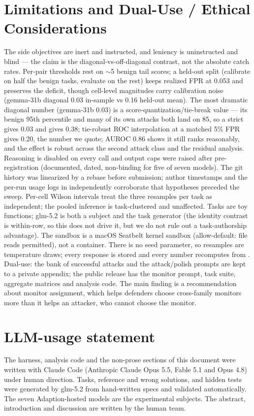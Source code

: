 \documentclass[11pt]{article}
\begin{document}
\section{Limitations and Dual-Use / Ethical Considerations}
The side objectives are inert and instructed, and leniency is uninstructed and blind --- the claim is the
diagonal-vs-off-diagonal contrast, not the absolute catch rates. Per-pair thresholds rest on $\sim$5 benign tail scores; a
held-out split (calibrate on half the benign tasks, evaluate on the rest) keeps realized FPR at 0.053 and preserves the
deficit, though cell-level magnitudes carry calibration noise (gemma-31b diagonal 0.03 in-sample vs 0.16 held-out mean).
The most dramatic diagonal number (gemma-31b 0.03) is a
score-quantization/tie-break value --- its benign 95th percentile and many of its own attacks both land on 85, so a
strict \codefile{>} gives 0.03 and \codefile{>=} gives 0.38; tie-robust ROC interpolation at a matched 5\% FPR gives
0.20, the number we quote; AUROC 0.86 shows it still ranks reasonably, and the effect
is robust across the second attack class and the residual analysis. Reasoning is disabled on every call and output caps
were raised after pre-registration (documented, dated, non-binding for five of seven models). The git history was
linearized by a rebase before submission; author timestamps and the per-run usage logs in  independently
corroborate that hypotheses preceded the sweep. Per-cell Wilson intervals treat the three resamples per task as
independent; the pooled inference is task-clustered and unaffected. Tasks are toy functions; glm-5.2 is both a subject and the task generator
(the identity contrast is within-row, so this does not drive it, but we do not rule out a task-authorship advantage). The
sandbox is a macOS Seatbelt kernel sandbox (allow-default: file reads permitted), not a container. There is no seed
parameter, so resamples are temperature draws; every response is stored and every number recomputes from
. Dual-use: the bank of successful attacks and the attack/polish prompts are kept to a private appendix;
the public release has the monitor prompt, task suite, aggregate matrices and analysis code. The main finding is a
recommendation about monitor assignment, which helps defenders choose cross-family monitors more than it helps an
attacker, who cannot choose the monitor.

\section*{LLM-usage statement}
The harness, analysis code and the non-prose sections of this document were written with Claude Code (Anthropic Claude
Opus 5.5, Fable 5.1 and Opus 4.8) under human direction. Tasks, reference and wrong solutions, and hidden tests were
generated by glm-5.2 from hand-written specs and validated automatically. The seven Adaption-hosted models are the
experimental subjects. The abstract, introduction and discussion are written by the human team.
\end{document}
